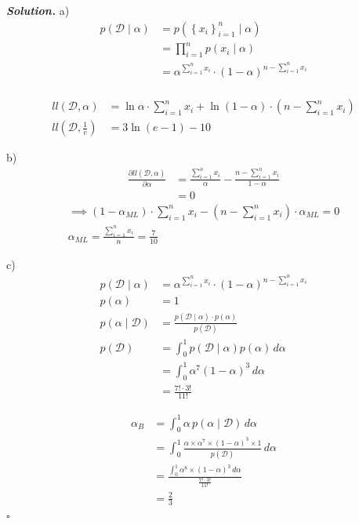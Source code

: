 \documentclass[12pt]{article}
\newenvironment{solution}[1][\it{Solution}]{\textbf{#1. } }{$\square$}
\begin{document}
\begin{solution}
a)
\begin{align*}
p(\mathcal{D} \mid \alpha) &= p(\left\{x_i\right\}_{i=1}^{n} \mid \alpha)\\
&= \prod_{i=1}^{n} p(x_i \mid \alpha)\\
&= \alpha^{\sum_{i=1}^{n}x_i} \cdot \left(1-\alpha \right)^{n - \sum_{i=1}^{n}x_i}\\
\end{align*}

\begin{align*}
ll\left(\mathcal{D}, \alpha\right) &= \ln \alpha \cdot \sum_{i=1}^{n}x_i + \ln \left(1-\alpha \right) \cdot \left(n-\sum_{i=1}^{n}x_i\right)\\
ll\left(\mathcal{D}, \frac{1}{e}\right) &= 3\ln\left(e-1\right)-10
\end{align*}

b)
\begin{align*}
\frac{\partial ll\left(\mathcal{D}, \alpha\right)}{\partial \alpha} &= \frac{\sum_{i=1}^{n}x_i}{\alpha} - \frac{n-\sum_{i=1}^{n}x_i}{1-\alpha}\\
&=0
\end{align*}
\begin{align*}
\implies \left(1-\alpha_{ML} \right) \cdot \sum_{i=1}^{n}x_i - \left(n - \sum_{i=1}^{n} x_i \right) \cdot \alpha_{ML} = 0\\
\alpha_{ML} = \frac{\sum_{i=1}^{n}x_i}{n} = \boxed {\frac{7}{10}}
\end{align*}

c)
\begin{align*}
p\left(\mathcal{D}\mid\alpha\right) &= \alpha^{\sum_{i=1}^{n}x_i} \cdot (1-\alpha)^{n-\sum_{i=1}^{n}x_i}\\
p\left(\alpha\right) &= 1\\
p\left(\alpha \mid \mathcal{D}\right) &= \frac{p\left(\mathcal{D} \mid \alpha \right) \cdot p\left(\alpha\right)}{p\left( \mathcal{D} \right)}\\
p\left( \mathcal{D} \right) &= \int_{0}^{1} p\left(\mathcal{D} \mid \alpha \right) p\left(\alpha \right)\,d\alpha\\
&=\int_{0}^{1} \alpha^7 \left(1-\alpha\right)^3 \, d\alpha\\
&=\frac{7!\cdot3!}{11!}
\end{align*}

\begin{align*}
\alpha_{B} &= \int_{0}^{1} \alpha \, p\left(\alpha \mid \mathcal{D}\right) \, d\alpha\\
&= \int_{0}^{1}\frac{\alpha \times \alpha^7 \times \left(1-\alpha\right)^{3} \times 1}{p\left(\mathcal{D}\right)} \, d\alpha\\
&= \frac{\int_{0}^{1}\alpha^8 \times \left(1-\alpha \right)^{3} \, d\alpha}{\frac{7! \cdot 3!}{11!}}\\
&= \boxed{\frac{2}{3}}
\end{align*}
\end{solution}
\end{document}
